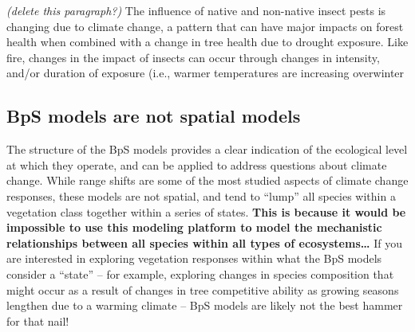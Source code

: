 \documentclass[
]{article}
\begin{document}
\emph{(delete this paragraph?)} The influence of native and non-native
insect pests is changing due to climate change, a pattern that can have
major impacts on forest health when combined with a change in tree
health due to drought exposure. Like fire, changes in the impact of
insects can occur through changes in intensity, and/or duration of
exposure (i.e., warmer temperatures are increasing overwinter

\hypertarget{bps-models-are-not-spatial-models}{%
\subsection{BpS models are not spatial
models}\label{bps-models-are-not-spatial-models}}

The structure of the BpS models provides a clear indication of the
ecological level at which they operate, and can be applied to address
questions about climate change. While range shifts are some of the most
studied aspects of climate change responses, these models are not
spatial, and tend to ``lump'' all species within a vegetation class
together within a series of states. \textbf{This is because it would be
impossible to use this modeling platform to model the mechanistic
relationships between all species within all types of
ecosystems\ldots{}} If you are interested in exploring vegetation
responses within what the BpS models consider a ``state'' -- for
example, exploring changes in species composition that might occur as a
result of changes in tree competitive ability as growing seasons
lengthen due to a warming climate -- BpS models are likely not the best
hammer for that nail!
\end{document}
